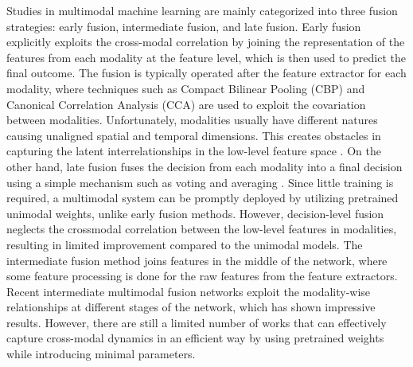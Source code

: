 \documentclass[10pt,twocolumn,letterpaper]{article}
\begin{document}
Studies in multimodal machine learning are mainly categorized into three fusion strategies: early fusion, intermediate fusion, and late fusion. Early fusion explicitly exploits the cross-modal correlation by joining the representation of the features from each modality at the feature level, which is then used to predict the final outcome. The fusion is typically operated after the feature extractor for each modality, where techniques such as Compact Bilinear Pooling (CBP) \cite{fukui2016multimodal, nguyen2018deep} and Canonical Correlation Analysis (CCA) \cite{liu2019multimodal, mittal2020m3er} are used to exploit the covariation between modalities. Unfortunately, modalities usually have different natures causing unaligned spatial and temporal dimensions. This creates obstacles in capturing the latent interrelationships in the low-level feature space \cite{baltruvsaitis2018multimodal}. On the other hand, late fusion fuses the decision from each modality into a final decision using a simple mechanism such as voting \cite{morvant2014majority} and averaging \cite{shutova-etal-2016-black}. Since little training is required, a multimodal system can be promptly deployed by utilizing pretrained unimodal weights, unlike early fusion methods. However, decision-level fusion neglects the crossmodal correlation between the low-level features in modalities, resulting in limited improvement compared to the unimodal models. The intermediate fusion method joins features in the middle of the network, where some feature processing is done for the raw features from the feature extractors. Recent intermediate multimodal fusion networks \cite{joze2020mmtm, vielzeuf2018centralnet, hu2019dense} exploit the modality-wise relationships at different stages of the network, which has shown impressive results. However, there are still a limited number of works that can effectively capture cross-modal dynamics in an efficient way by using pretrained weights while introducing minimal parameters. 
\end{document}

